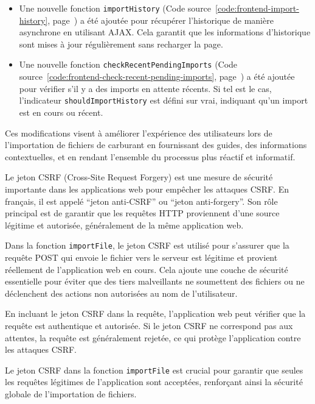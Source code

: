 \begin{itemize}
    \item Une nouvelle fonction \Verb|importHistory| (Code source~\ref{code:frontend-import-history}, page~\pageref{code:frontend-import-history}) a été ajoutée pour récupérer l'historique de manière asynchrone en utilisant AJAX. Cela garantit que les informations d'historique sont mises à jour régulièrement sans recharger la page.
    \item Une nouvelle fonction \Verb|checkRecentPendingImports|  (Code source~\ref{code:frontend-check-recent-pending-imports}, page~\pageref{code:frontend-check-recent-pending-imports}) a été ajoutée pour vérifier s'il y a des imports en attente récents. Si tel est le cas, l'indicateur \Verb|shouldImportHistory| est défini sur vrai, indiquant qu'un import est en cours ou récent.
\end{itemize}

Ces modifications visent à améliorer l'expérience des utilisateurs lors de l'importation de fichiers de carburant en fournissant des guides, des informations contextuelles, et en rendant l'ensemble du processus plus réactif et informatif.

Le jeton CSRF (Cross-Site Request Forgery) est une mesure de sécurité importante dans les applications web pour empêcher les attaques CSRF. En français, il est appelé \foreignquote{french}{jeton anti-CSRF} ou \foreignquote{french}{jeton anti-forgery}. Son rôle principal est de garantir que les requêtes HTTP proviennent d'une source légitime et autorisée, généralement de la même application web.

Dans la fonction \Verb|importFile|, le jeton CSRF est utilisé pour s'assurer que la requête POST qui envoie le fichier vers le serveur est légitime et provient réellement de l'application web en cours. Cela ajoute une couche de sécurité essentielle pour éviter que des tiers malveillants ne soumettent des fichiers ou ne déclenchent des actions non autorisées au nom de l'utilisateur.

En incluant le jeton CSRF dans la requête, l'application web peut vérifier que la requête est authentique et autorisée. Si le jeton CSRF ne correspond pas aux attentes, la requête est généralement rejetée, ce qui protège l'application contre les attaques CSRF.

Le jeton CSRF dans la fonction \Verb|importFile| est crucial pour garantir que seules les requêtes légitimes de l'application sont acceptées, renforçant ainsi la sécurité globale de l'importation de fichiers.


